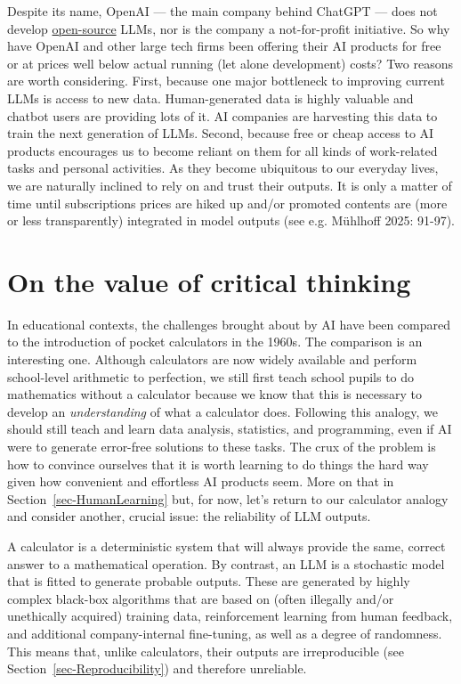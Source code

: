 \documentclass[
  letterpaper,
  DIV=11,
  numbers=noendperiod]{scrreprt}
\begin{document}
Despite its name, OpenAI --- the main company behind ChatGPT --- does
not develop \hyperref[sec-OpenSource]{open-source} LLMs, nor is the
company a not-for-profit initiative. So why have OpenAI and other large
tech firms been offering their AI products for free or at prices well
below actual running (let alone development) costs? Two reasons are
worth considering. First, because one major bottleneck to improving
current LLMs is access to new data. Human-generated data is highly
valuable and chatbot users are providing lots of it. AI companies are
harvesting this data to train the next generation of LLMs. Second,
because free or cheap access to AI products encourages us to become
reliant on them for all kinds of work-related tasks and personal
activities. As they become ubiquitous to our everyday lives, we are
naturally inclined to rely on and trust their outputs. It is only a
matter of time until subscriptions prices are hiked up and/or promoted
contents are (more or less transparently) integrated in model outputs
(see e.g. Mühlhoff 2025: 91-97).

\section{On the value of critical
thinking}\label{on-the-value-of-critical-thinking}

In educational contexts, the challenges brought about by AI have been
compared to the introduction of pocket calculators in the 1960s. The
comparison is an interesting one. Although calculators are now widely
available and perform school-level arithmetic to perfection, we still
first teach school pupils to do mathematics without a calculator because
we know that this is necessary to develop an \emph{understanding} of
what a calculator does. Following this analogy, we should still teach
and learn data analysis, statistics, and programming, even if AI were to
generate error-free solutions to these tasks. The crux of the problem is
how to convince ourselves that it is worth learning to do things the
hard way given how convenient and effortless AI products seem. More on
that in Section~\ref{sec-HumanLearning} but, for now, let's return to
our calculator analogy and consider another, crucial issue: the
reliability of LLM outputs.

A calculator is a deterministic system that will always provide the
same, correct answer to a mathematical operation. By contrast, an LLM is
a stochastic model that is fitted to generate probable outputs. These
are generated by highly complex black-box algorithms that are based on
(often illegally and/or unethically acquired) training data,
reinforcement learning from human feedback, and additional
company-internal fine-tuning, as well as a degree of randomness. This
means that, unlike calculators, their outputs are irreproducible (see
Section~\ref{sec-Reproducibility}) and therefore unreliable.
\end{document}
